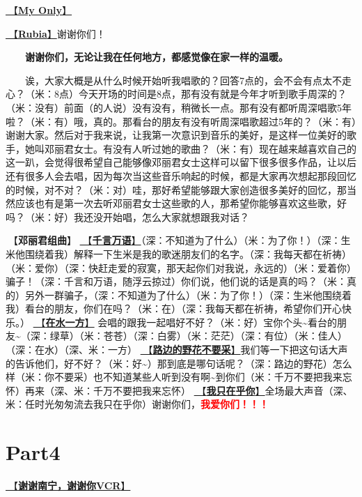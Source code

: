 \documentclass[]{ctexbook}
\begin{document}
\hyperref[my-only]{🎵【\textbf{My Only}】}

\hyperref[rubia]{🎵【\textbf{Rubia}】}谢谢你们！

  \textbf{谢谢你们，无论让我在任何地方，都感觉像在家一样的温暖。}

  诶，大家大概是从什么时候开始听我唱歌的？回答7点的，会不会有点太不走心？（米：8点）今天开场的时间是8点，那有没有就是今年才听到歌手周深的？（米：没有）前面（的人说）没有没有，稍微长一点。那有没有都听周深唱歌5年啦？（米：有）哦，真的。那看台的朋友有没有听周深唱歌超过5年的？（米：有）谢谢大家。然后对于我来说，让我第一次意识到音乐的美好，是这样一位美好的歌手，她叫邓丽君女士。有没有人听过她的歌曲？（米：有）现在越来越喜欢自己的这一趴，会觉得很希望自己能够像邓丽君女士这样可以留下很多很多作品，让以后还有很多人会去唱，因为每次当这些音乐响起的时候，都是大家再次想起那段回忆的时候，对不对？（米：对）哇，那好希望能够跟大家创造很多美好的回忆，那当然应该也有是第一次去听邓丽君女士这些歌的人，那希望你能够喜欢这些歌，好吗？（米：好）我还没开始唱，怎么大家就想跟我对话？

🎵【\textbf{邓丽君组曲}】
\hyperref[thousands-of-words]{🎵【\textbf{千言万语}】}（深：不知道为了什么）（米：为了你！）（深：生米他围绕着我）解释一下生米是我的歌迷朋友们的名字。（深：我每天都在祈祷）（米：爱你）（深：快赶走爱的寂寞，那天起你们对我说，永远的）（米：爱着你）骗子！（深：千言和万语，随浮云掠过）你们说，他们说的话是真的吗？（米：真的）另外一群骗子，（深：不知道为了什么）（米：为了你！）（深：生米他围绕着我）看台的朋友，你们在吗？（米：在）（深：我每天都在祈祷，希望你们开心快乐。）
\hyperref[on-the-water-side]{🎵【\textbf{在水一方}】} 会唱的跟我一起唱好不好？（米：好）宝你个头\textasciitilde 看台的朋友\textasciitilde（深：绿草）（米：苍苍）（深：白雾）（米：茫茫）（深：有位）（米：佳人）（深：在水）（深、米：一方）
\hyperref[only-with-me]{🎵【\textbf{路边的野花不要采}】}我们等一下把这句话大声的告诉他们，好不好？（米：好\textasciitilde）那到底是哪句话呢？（深：路边的野花）怎么样（米：你不要采）也不知道某些人听到没有啊\textasciitilde 到你们（米：千万不要把我来忘怀）再来（深、米：千万不要把我来忘怀）
\hyperref[only-you]{🎵【\textbf{我只在乎你}】}全场最大声音（深、米：任时光匆匆流去我只在乎你）谢谢你们，\textbf{\textcolor{red}{我爱你们！！！} }

\section{Part4}\label{nanning-20241206-part4}

\hyperref[thank-you-vcr]{🎥【\textbf{谢谢南宁，谢谢你VCR}】}
\end{document}
